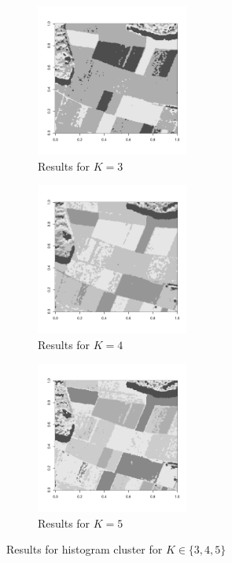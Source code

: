 \documentclass[11pt]{scrartcl}
\begin{document}
\begin{figure}[H]
\centering
\begin{subfigure}[t]{.3\textwidth}
\centering\includegraphics[height=5cm]{./hw4/plot3.pdf}
\caption{Results for $K=3$}
\label{k3}
\end{subfigure}
\begin{subfigure}[t]{.3\textwidth}
\centering\includegraphics[height=5cm]{./hw4/plot4.pdf}
\caption{Results for $K=4$}
\label{k4}
\end{subfigure}
\begin{subfigure}[t]{.3\textwidth}
\centering\includegraphics[height=5cm]{./hw4/plot5.pdf}
\caption{Results for $K=5$}
\label{k5}
\end{subfigure}
\caption{Results for histogram cluster for $K \in \{3, 4, 5\}$}
\end{figure}
\end{document}
